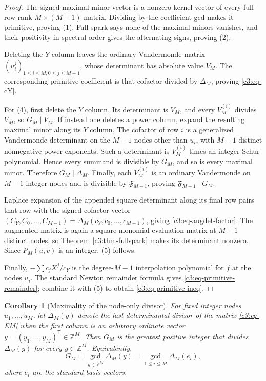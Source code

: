 \documentclass[11pt,oneside]{article}
\newtheorem{corollary}[theorem]{Corollary}
\theoremstyle{definition}
\theoremstyle{remark}
\newcommand{\Z}{\mathbb Z}
\newcommand{\SF}[1]{\mathfrak F_{#1}}
\begin{document}
\begin{proof}
The signed maximal-minor vector is a nonzero kernel vector of every full-row-rank
$M\times(M+1)$ matrix.  Dividing by the coefficient gcd makes it primitive, proving (1).
Full spark says none of the maximal minors vanishes, and their positivity in spectral order
gives the alternating signs, proving (2).

Deleting the $Y$ column leaves the ordinary Vandermonde matrix
$(u_i^j)_{1\le i\le M,0\le j\le M-1}$, whose determinant has absolute value $V_M$.
The corresponding primitive coefficient is that cofactor divided by $\Delta_M$, proving
\eqref{c3:eq-cY}.

For (4), first delete the $Y$ column.  Its determinant is $V_M$, and every
$V_M^{(i)}$ divides $V_M$, so $G_M\mid V_M$.  If instead one deletes a power column, expand
the resulting maximal minor along its $Y$ column.  The cofactor of row $i$ is a generalized
Vandermonde determinant on the $M-1$ nodes other than $u_i$, with $M-1$ distinct
nonnegative power exponents.  Such a determinant is $V_M^{(i)}$ times an integer Schur
polynomial.  Hence every summand is divisible by $G_M$, and so is every maximal minor.
Therefore $G_M\mid\Delta_M$.  Finally, each $V_M^{(i)}$ is an ordinary Vandermonde on
$M-1$ integer nodes and is divisible by $\SF{M-1}$, proving
$\SF{M-1}\mid G_M$.

Laplace expansion of the appended square determinant along its final row pairs that row with
the signed cofactor vector
$(C_Y,C_0,\ldots,C_{M-1})=\Delta_M(c_Y,c_0,\ldots,c_{M-1})$, giving
\eqref{c3:eq-augdet-factor}.  The augmented matrix is again a square monomial evaluation
matrix at $M+1$ distinct nodes, so Theorem~\ref{c3:thm-fullspark} makes its determinant
nonzero.  Since $P_M(u,v)$ is an integer, (5) follows.

Finally, $-\sum c_jX^j/c_Y$ is the degree-$M-1$ interpolation polynomial for $f$ at the
nodes $u_i$.  The standard Newton remainder formula gives
\eqref{c3:eq-primitive-remainder}; combine it with (5) to obtain
\eqref{c3:eq-primitive-ineq}.
\end{proof}

\begin{corollary}[Maximality of the node-only divisor]
\label{c3:cor-node-maximal}
For fixed integer nodes $u_1,\ldots,u_M$, let $\Delta_M(y)$ denote the last determinantal
divisor of the matrix \eqref{c3:eq-EM} when the first column is an arbitrary ordinate vector
$y=(y_1,\ldots,y_M)^{\mathsf T}\in\Z^M$.  Then $G_M$ is the greatest positive integer that
divides $\Delta_M(y)$ for every $y\in\Z^M$.  Equivalently,
\begin{equation}
 G_M=\gcd_{y\in\Z^M}\Delta_M(y)
     =\gcd_{1\le i\le M}\Delta_M(e_i),
 \label{c3:eq-G-universal}
\end{equation}
where $e_i$ are the standard basis vectors.
\end{corollary}
\end{document}
